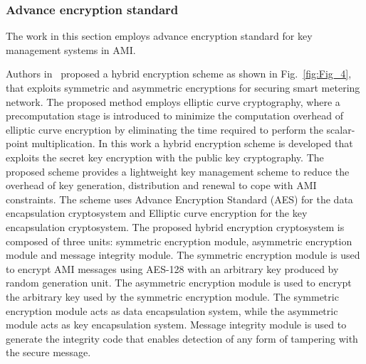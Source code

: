 \subsubsection{Advance encryption standard}
The work in this section employs advance encryption standard for key management systems in AMI.
\par Authors in~\cite{Khasawneh17} proposed a hybrid encryption scheme as shown in Fig.~\ref{fig:Fig_4}, that exploits symmetric and asymmetric encryptions for securing smart metering network. The proposed method employs elliptic curve cryptography, where a precomputation stage is introduced to minimize the computation overhead of elliptic curve encryption by eliminating the time required to perform the scalar-point multiplication. In this work a hybrid encryption scheme is developed that exploits the secret key encryption with the public key cryptography. The proposed scheme provides a lightweight key management scheme to reduce the overhead of key generation, distribution and renewal to cope with AMI constraints. The scheme uses Advance Encryption Standard (AES) for the data encapsulation cryptosystem and Elliptic curve encryption for the key encapsulation cryptosystem. The proposed hybrid encryption cryptosystem is composed of three units: symmetric encryption module, asymmetric encryption module and message integrity module. The symmetric encryption module is used to encrypt AMI messages using AES-128 with an arbitrary key produced by random generation unit. The asymmetric encryption module is used to encrypt the arbitrary key used by the symmetric encryption module. The symmetric encryption module acts as data encapsulation system, while the asymmetric module acts as key encapsulation system. Message integrity module is used to generate the integrity code that enables detection of any form of tampering with the secure message.

